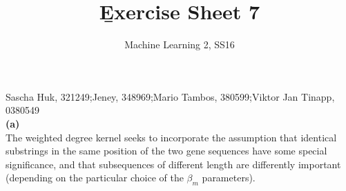 \documentclass[a4paper]{article}
\newcommand{\1}{\mathds{1}}
\begin{document}
\title{\b{Exercise Sheet 7}}
\author{Machine Learning 2, SS16}

\maketitle

Sascha Huk, 321249;\quad Jeney, 348969;\quad Mario Tambos, 380599;\quad Viktor Jan Tinapp, 0380549\\


\textbf{(a)}\\
The weighted degree kernel seeks to incorporate the assumption that identical substrings in the same position of the two gene sequences have some special significance, and that subsequences of different length are differently important (depending on the particular choice of the $\beta_m$ parameters).
\end{document}
